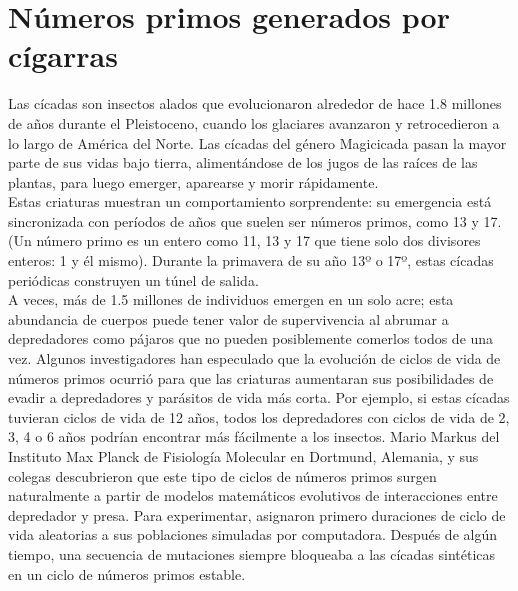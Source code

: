 
\section*{Números primos generados por cígarras}

\noindent Las cícadas son insectos alados que evolucionaron alrededor de hace 1.8 millones de años durante el Pleistoceno, cuando los glaciares avanzaron y retrocedieron a lo largo de América del Norte. Las cícadas del género Magicicada pasan la mayor parte de sus vidas bajo tierra, alimentándose de los jugos de las raíces de las plantas, para luego emerger, aparearse y morir rápidamente. \\ 

\noindent Estas criaturas muestran un comportamiento sorprendente: su emergencia está sincronizada con períodos de años que suelen ser números primos, como 13 y 17. (Un número primo es un entero como 11, 13 y 17 que tiene solo dos divisores enteros: 1 y él mismo). Durante la primavera de su año 13º o 17º, estas cícadas periódicas construyen un túnel de salida. \\

\noindent A veces, más de 1.5 millones de individuos emergen en un solo acre; esta abundancia de cuerpos puede tener valor de supervivencia al abrumar a depredadores como pájaros que no pueden posiblemente comerlos todos de una vez.
Algunos investigadores han especulado que la evolución de ciclos de vida de números primos ocurrió para que las criaturas aumentaran sus posibilidades de evadir a depredadores y parásitos de vida más corta. Por ejemplo, si estas cícadas tuvieran ciclos de vida de 12 años, todos los depredadores con ciclos de vida de 2, 3, 4 o 6 años podrían encontrar más fácilmente a los insectos. Mario Markus del Instituto Max Planck de Fisiología Molecular en Dortmund, Alemania, y sus colegas descubrieron que este tipo de ciclos de números primos surgen naturalmente a partir de modelos matemáticos evolutivos de interacciones entre depredador y presa. Para experimentar, asignaron primero duraciones de ciclo de vida aleatorias a sus poblaciones simuladas por computadora. Después de algún tiempo, una secuencia de mutaciones siempre bloqueaba a las cícadas sintéticas en un ciclo de números primos estable. \\

